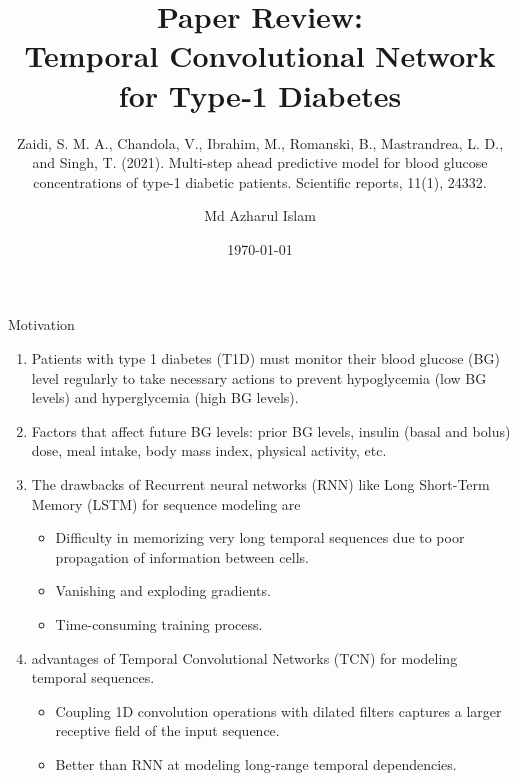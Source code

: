 \documentclass[8pt,xcolor=dvipsnames,compress]{beamer}
\title[Fall,2019]{
Paper Review:\\
Temporal Convolutional Network for
Type‐1 Diabetes
}
\subtitle{Zaidi, S. M. A., Chandola, V., Ibrahim, M., Romanski, B., Mastrandrea, L. D., and Singh, T. (2021). Multi-step ahead predictive model for blood glucose concentrations of type-1 diabetic patients. Scientific reports, 11(1), 24332.}
\author{Md Azharul Islam}
\institute[UB]{Advisor:  Dr. Danial Faghihi\\University at Buffalo\\}
\date[\today]{\today}
\begin{document}
\maketitle

\begin{frame}[fragile]{Motivation }

 \begin{enumerate}
    \item  Patients with type 1 diabetes (T1D) must monitor their blood
glucose (BG) level regularly to take necessary actions to prevent hypoglycemia (low BG levels) and hyperglycemia (high BG levels). 
    
    \item  Factors that affect future BG levels: prior BG levels, insulin (basal and bolus) dose, meal intake, body mass index, physical activity, etc. 

    \item The drawbacks of Recurrent neural networks (RNN) like Long Short-Term Memory (LSTM) for sequence modeling are
    \begin{itemize}
         \item Difficulty in memorizing very long temporal sequences due to poor propagation of information between cells.
         \item Vanishing and exploding gradients.
         \item Time-consuming training process.
    \end{itemize}
    
    \item advantages of Temporal Convolutional Networks (TCN) for modeling temporal sequences. 
    \begin{itemize}
         \item Coupling 1D convolution operations with dilated filters captures a larger receptive field of the input sequence.
         \item Better than RNN at modeling long-range temporal dependencies.
    \end{itemize}


\end{enumerate}
\end{frame}
\end{document}
